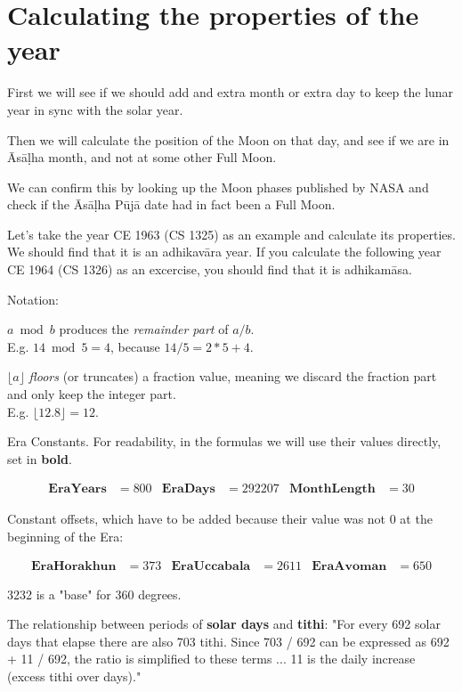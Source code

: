 \documentclass[11pt,oneside]{memoir-article}
\begin{document}
\section{Calculating the properties of the year}
\label{sec-4-2}

First we will see if we should add and extra month or extra day to keep the
lunar year in sync with the solar year.

Then we will calculate the position of the Moon on that day, and see if we are
in Āsāḷha month, and not at some other Full Moon.

We can confirm this by looking up the Moon phases published by NASA and check if
the Āsāḷha Pūjā date had in fact been a Full Moon.

Let's take the year CE 1963 (CS 1325) as an example and calculate its
properties. We should find that it is an adhikavāra year. If you calculate the
following year CE 1964 (CS 1326) as an excercise, you should find that it is
adhikamāsa.

Notation:

$a \bmod b$ produces the \emph{remainder part} of $a/b$.\\
E.g. $14 \bmod 5 = 4$, because $14/5 = 2*5 + 4$.

$\lfloor a \rfloor$ \emph{floors} (or truncates) a fraction value, meaning we discard
the fraction part and only keep the integer part.\\
E.g. $\lfloor 12.8 \rfloor = 12$.


Era Constants. For readability, in the formulas we will use their values directly, set in \textbf{bold}.

\begin{align*}
  \mathbf{EraYears} & = 800 & \mathbf{EraDays} & = 292207 & \mathbf{MonthLength} & = 30
\end{align*}

Constant offsets, which have to be added because their value was not 0 at the beginning of the Era:

\begin{align*}
  \mathbf{EraHorakhun} & = 373 & \mathbf{EraUccabala} & = 2611 & \mathbf{EraAvoman} & = 650 
\end{align*}

3232 is a "base" for 360 degrees.\autocite[p. 48]{eade1995calendrical}

The relationship between periods of \textbf{solar days} and \textbf{tithi}:
"For every 692 solar days that elapse there are also 703 tithi.
Since 703 / 692 can be expressed as 692 + 11 / 692, the ratio is simplified to these terms ...
11 is the daily increase (excess tithi over days)."\autocite[p. 48]{eade1995calendrical}
\end{document}

